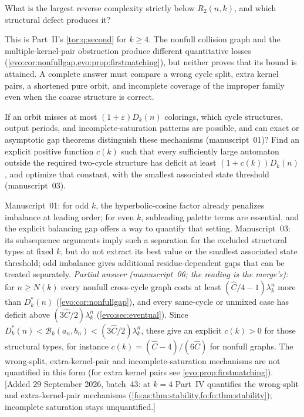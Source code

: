 \documentclass[11pt,a4paper]{article}
\numberwithin{equation}{section}
\theoremstyle{definition}
\theoremstyle{remark}
\newcommand{\Bip}{\mathcal B}
\begin{document}
\begin{question}\label{evo:q:second}
What is the largest reverse complexity strictly below $R_2(n,k)$, and which
structural defect produces it?
\end{question}
This is Part~II's \cref{tor:q:second} for $k\ge4$. The nonfull collision graph
and the multiple-kernel-pair obstruction produce different quantitative
losses (\cref{evo:cor:nonfullgap,evo:prop:firstmatching}), but neither proves
that its bound is attained. A complete answer must compare a wrong cycle
split, extra kernel pairs, a shortened pure orbit, and incomplete coverage of
the improper family even when the coarse structure is correct.

\begin{question}\label{evo:q:stability}
If an orbit misses at most $(1+\varepsilon)D_k(n)$ colorings, which cycle
structures, output periods, and incomplete-saturation patterns are possible,
and can exact or asymptotic gap theorems distinguish these mechanisms
(manuscript~01)? Find an explicit positive function $c(k)$ such that every
sufficiently large automaton outside the required two-cycle structure has
deficit at least $(1+c(k))D_k(n)$, and optimize that constant, with the
smallest associated state threshold (manuscript~03).
\end{question}
Manuscript~01: for odd $k$, the hyperbolic-cosine factor already penalizes
imbalance at leading order; for even $k$, subleading palette terms are
essential, and the explicit balancing gap offers a way to quantify that
setting. Manuscript~03: its subsequence arguments imply such a separation for
the excluded structural types at fixed $k$, but do not extract its best value
or the smallest associated state threshold; odd imbalance gives additional
residue-dependent gaps that can be treated separately. \emph{Partial answer
(manuscript~06; the reading is the merge's):} for $n\ge N(k)$ every nonfull
cross-cycle graph costs at least $(\hat C/4-1)\lambda_k^n$ more than
$D^*_k(n)$ (\cref{evo:cor:nonfullgap}), and every same-cycle or unmixed case
has deficit above $(3\hat C/2)\lambda_k^n$ (\cref{evo:sec:eventual}). Since
$D^*_k(n)<\Bip_k(a_n,b_n)<(3\hat C/2)\lambda_k^n$, these give an explicit
$c(k)>0$ for those structural types, for instance $c(k)=(\hat C-4)/(6\hat C)$
for nonfull graphs. The wrong-split, extra-kernel-pair and
incomplete-saturation mechanisms are not quantified in this form (for extra
kernel pairs see \cref{evo:prop:firstmatching}). [Added 29 September 2026,
batch~43: at $k=4$ Part~IV quantifies the wrong-split and extra-kernel-pair
mechanisms (\cref{fo:as:thm:stability,fo:fo:thm:stability}); incomplete
saturation stays unquantified.]
\end{document}

